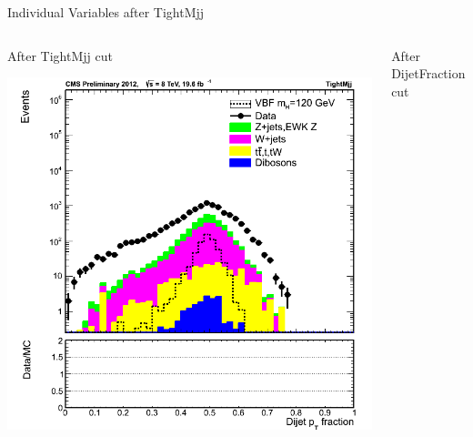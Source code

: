 \documentclass[8pt]{beamer}
\begin{document}
\begin{frame}{Individual Variables after TightMjj}

\begin{columns}

\column[t]{5.5cm}   
\begin{block}{After TightMjj cut}
 
  \begin{center}
  \includegraphics[width=1.00\textwidth]{img/dijetOverMetPt_2012_TightMjj_log.png}
  \end{center}

\end{block}

\column[t]{5.5cm}
\begin{block}{After DijetFraction cut}


\end{block}
\end{columns}
\end{frame}
\end{document}
